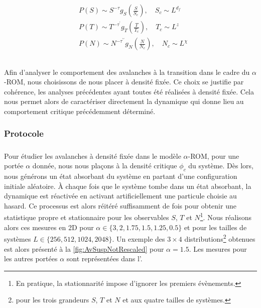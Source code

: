 \begin{equation}
	\begin{aligned}
		&P(S) \sim S^{-\tau}g_S\left( \frac{S}{S_c} \right), \quad S_c \sim L^{d_f}\\
		&P(T) \sim T^{-\tau^\prime}g_T\left( \frac{T}{T_c} \right), \quad T_c \sim L^{z}\\
		&P(N) \sim N^{-\tau^{\prime\prime}}g_N\left( \frac{N}{N_c} \right), \quad N_c \sim L^{\chi}\\
	\end{aligned}
	\label{eq:AvDistribSusp}
\end{equation}

\subparagraph{}Afin d'analyser le comportement des avalanches à la transition dans le cadre du $\alpha$-ROM, nous choisissons de nous placer à densité fixée. Ce choix se justifie par cohérence, les analyses précédentes ayant toutes été réalisées à densité fixée. Cela nous permet alors de caractériser directement la dynamique qui donne lieu au comportement critique précédemment déterminé.

\subsubsection{Protocole}

\subparagraph{}Pour étudier les avalanches à densité fixée dans le modèle $\alpha$-ROM, pour une portée $\alpha$ donnée, nous nous plaçons à la densité critique $\phi_c$ du système. Dès lors, nous générons un état absorbant du système en partant d'une configuration initiale aléatoire. \`A chaque fois que le système tombe dans un état absorbant, la dynamique est réactivée en activant artificiellement une particule choisie au hasard. Ce processus est alors réitéré suffisamment de fois pour obtenir une statistique propre et stationnaire pour les observables $S$, $T$ et $N$\footnote{En pratique, la stationnarité impose d'ignorer les premiers évènements.}. Nous réalisons alors ces mesures en 2D pour $\alpha \in \{ 3, 2, 1.75, 1.5, 1.25, 0.5\}$ et pour les tailles de systèmes $L \in \{ 256, 512, 1024, 2048 \}$. Un exemple des $3\times 4$ distributions\footnote{pour les trois grandeurs $S$, $T$ et $N$ et aux quatre tailles de systèmes.} obtenues est alors présenté à la \autoref{fig:AvSuspNotRescaled} pour $\alpha = 1.5$. Les mesures pour les autres portées $\alpha$ sont représentées dans l'.

